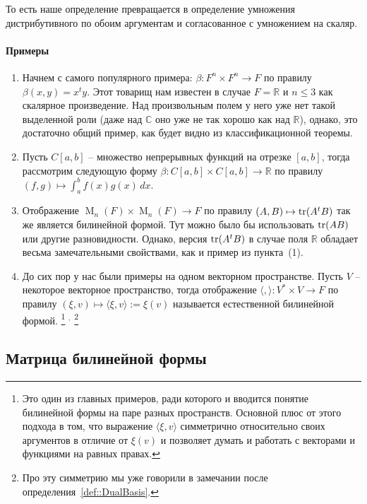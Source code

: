 То есть наше определение превращается в определение умножения дистрибутивного по обоим аргументам и согласованное с умножением на скаляр.

\paragraph{Примеры}

\begin{enumerate}
\item Начнем с самого популярного примера: $\beta\colon F^n\times F^n \to F$ по правилу $\beta(x,y) = x^t y$.
Этот товарищ нам известен в случае $F = \mathbb R$ и $n\leqslant 3$ как скалярное произведение.
Над произвольным полем у него уже нет такой выделенной роли (даже над $\mathbb C$ оно уже не так хорошо как над $\mathbb R$), однако, это достаточно общий пример, как будет видно из классификационной теоремы.

\item Пусть $C[a,b]$ -- множество непрерывных функций на отрезке $[a,b]$, тогда рассмотрим следующую форму $\beta\colon C[a,b]\times C[a,b]\to \mathbb R$ по правилу $(f,g)\mapsto \int_a^b f(x)g(x)\,dx$.

\item Отображение $\operatorname{M}_n(F)\times \operatorname{M}_n(F)\to F$ по правилу $(A,B)\mapsto \operatorname{tr}(A^tB)$ так же является билинейной формой.
Тут можно было бы использовать $\operatorname{tr}(AB)$ или другие разновидности.
Однако, версия $\operatorname{tr}(A^tB)$ в случае поля $\mathbb R$ обладает весьма замечательными свойствами, как и пример из пункта~(1).

\item До сих пор у нас были примеры на одном векторном пространстве.
Пусть $V$ -- некоторое векторное пространство, тогда отображение $\langle,\rangle\colon V^*\times V\to F$ по правилу $(\xi,v)\mapsto \langle\xi,v\rangle := \xi(v)$ называется естественной билинейной формой.%
\footnote{Это один из главных примеров, ради которого и вводится понятие билинейной формы на паре разных пространств.
Основной плюс от этого подхода в том, что выражение $\langle \xi,v\rangle$ симметрично относительно своих аргументов в отличие от $\xi(v)$ и позволяет думать и работать с векторами и функциями на равных правах.}%
${}^{,}$%
\footnote{Про эту симметрию мы уже говорили в замечании после определения~\ref{def::DualBasis}.}
\end{enumerate}

\subsection{Матрица билинейной формы}

